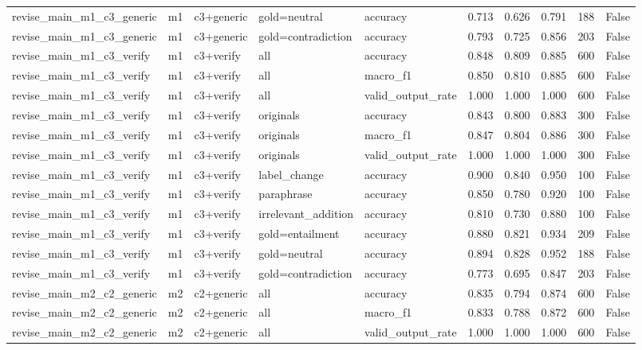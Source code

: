\begin{tabular}{llllllllll}
revise\_main\_m1\_c3\_generic & m1 & c3+generic & gold=neutral & accuracy & 0.713 & 0.626 & 0.791 & 188 & False \\
revise\_main\_m1\_c3\_generic & m1 & c3+generic & gold=contradiction & accuracy & 0.793 & 0.725 & 0.856 & 203 & False \\
revise\_main\_m1\_c3\_verify & m1 & c3+verify & all & accuracy & 0.848 & 0.809 & 0.885 & 600 & False \\
revise\_main\_m1\_c3\_verify & m1 & c3+verify & all & macro\_f1 & 0.850 & 0.810 & 0.885 & 600 & False \\
revise\_main\_m1\_c3\_verify & m1 & c3+verify & all & valid\_output\_rate & 1.000 & 1.000 & 1.000 & 600 & False \\
revise\_main\_m1\_c3\_verify & m1 & c3+verify & originals & accuracy & 0.843 & 0.800 & 0.883 & 300 & False \\
revise\_main\_m1\_c3\_verify & m1 & c3+verify & originals & macro\_f1 & 0.847 & 0.804 & 0.886 & 300 & False \\
revise\_main\_m1\_c3\_verify & m1 & c3+verify & originals & valid\_output\_rate & 1.000 & 1.000 & 1.000 & 300 & False \\
revise\_main\_m1\_c3\_verify & m1 & c3+verify & label\_change & accuracy & 0.900 & 0.840 & 0.950 & 100 & False \\
revise\_main\_m1\_c3\_verify & m1 & c3+verify & paraphrase & accuracy & 0.850 & 0.780 & 0.920 & 100 & False \\
revise\_main\_m1\_c3\_verify & m1 & c3+verify & irrelevant\_addition & accuracy & 0.810 & 0.730 & 0.880 & 100 & False \\
revise\_main\_m1\_c3\_verify & m1 & c3+verify & gold=entailment & accuracy & 0.880 & 0.821 & 0.934 & 209 & False \\
revise\_main\_m1\_c3\_verify & m1 & c3+verify & gold=neutral & accuracy & 0.894 & 0.828 & 0.952 & 188 & False \\
revise\_main\_m1\_c3\_verify & m1 & c3+verify & gold=contradiction & accuracy & 0.773 & 0.695 & 0.847 & 203 & False \\
revise\_main\_m2\_c2\_generic & m2 & c2+generic & all & accuracy & 0.835 & 0.794 & 0.874 & 600 & False \\
revise\_main\_m2\_c2\_generic & m2 & c2+generic & all & macro\_f1 & 0.833 & 0.788 & 0.872 & 600 & False \\
revise\_main\_m2\_c2\_generic & m2 & c2+generic & all & valid\_output\_rate & 1.000 & 1.000 & 1.000 & 600 & False \\

\end{tabular}
